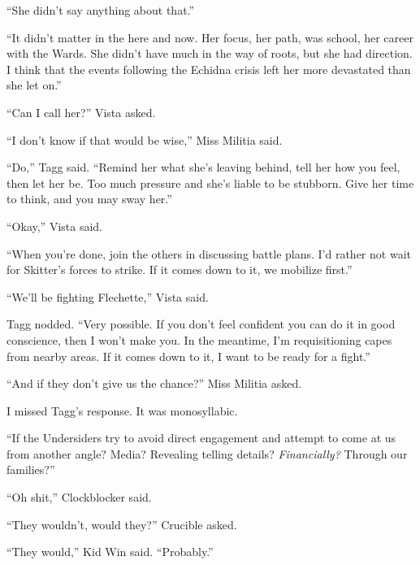 ``She didn't say anything about that.''



``It didn't matter in the here and now.  Her focus, her path, was school, her career with the Wards.  She didn't have much in the way of roots, but she had direction.  I think that the events following the Echidna crisis left her more devastated than she let on.''



``Can I call her?'' Vista asked.



``I don't know if that would be wise,'' Miss Militia said.



``Do,'' Tagg said.  ``Remind her what she's leaving behind, tell her how you feel, then let her be.  Too much pressure and she's liable to be stubborn.  Give her time to think, and you may sway her.''



``Okay,'' Vista said.



``When you're done, join the others in discussing battle plans.  I'd rather not wait for Skitter's forces to strike.  If it comes down to it, we mobilize first.''



``We'll be fighting Flechette,'' Vista said.



Tagg nodded.  ``Very possible.  If you don't feel confident you can do it in good conscience, then I won't make you.  In the meantime, I'm requisitioning capes from nearby areas.  If it comes down to it, I want to be ready for a fight.''



``And if they don't give us the chance?'' Miss Militia asked.



I missed Tagg's response.  It was monosyllabic.



``If the Undersiders try to avoid direct engagement and attempt to come at us from another angle?  Media?  Revealing telling details?  \emph{Financially?  }Through our families?''



``Oh shit,'' Clockblocker said.



``They wouldn't, would they?'' Crucible asked.



``They would,'' Kid Win said.  ``Probably.''



